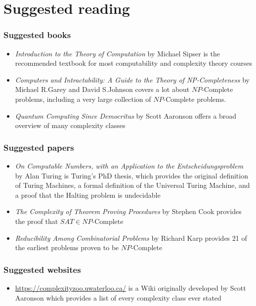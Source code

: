 \documentclass[aspectratio=169]{beamer}
\begin{document}
\section{Suggested reading}

\begin{frame}
\frametitle{Suggested books}
\begin{itemize}
    \item {\em Introduction to the Theory of Computation} by Michael Sipser is the recommended textbook for most computability and complexity theory courses
    \item {\em Computers and Intractability: A Guide to the Theory of NP-Completeness} by Michael R.\@ Garey and David S.\@ Johnson covers a lot about $NP\text{-Complete}$ problems, including a very large collection of $NP\text{-Complete}$ problems.
    \item {\em Quantum Computing Since Democritus} by Scott Aaronson offers a broad overview of many complexity classes
\end{itemize}
\end{frame}

\begin{frame}
\frametitle{Suggested papers}
\begin{itemize}
    \item {\em On Computable Numbers, with an Application to the Entscheidungsproblem} by Alan Turing is Turing's PhD thesis, which provides the original definition of Turing Machines, a formal definition of the Universal Turing Machine, and a proof that the Halting problem is undecidable
    \item {\em The Complexity of Theorem Proving Procedures} by Stephen Cook provides the proof that $SAT \in NP\text{-Complete}$
    \item {\em Reducibility Among Combinatorial Problems} by Richard Karp provides 21 of the earliest problems proven to be $NP\text{-Complete}$
\end{itemize}
\end{frame}

\begin{frame}
\frametitle{Suggested websites}
\begin{itemize}
    \item \url{https://complexityzoo.uwaterloo.ca/} is a Wiki originally developed by Scott Aaronson which provides a list of every complexity class ever stated
\end{itemize}
\end{frame}
\end{document}
